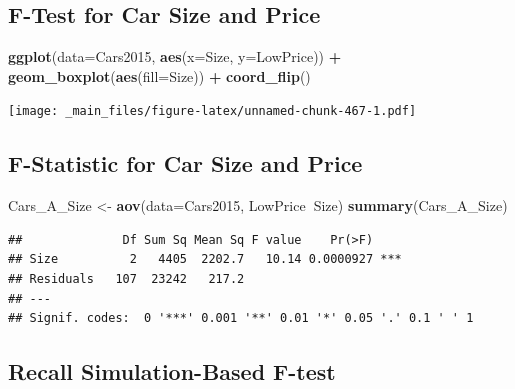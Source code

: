 \documentclass[]{book}
\newenvironment{Shaded}{\begin{snugshade}}{\end{snugshade}}
\newcommand{\KeywordTok}[1]{\textcolor[rgb]{0.13,0.29,0.53}{\textbf{#1}}}
\newcommand{\DataTypeTok}[1]{\textcolor[rgb]{0.13,0.29,0.53}{#1}}
\newcommand{\DecValTok}[1]{\textcolor[rgb]{0.00,0.00,0.81}{#1}}
\newcommand{\StringTok}[1]{\textcolor[rgb]{0.31,0.60,0.02}{#1}}
\newcommand{\OperatorTok}[1]{\textcolor[rgb]{0.81,0.36,0.00}{\textbf{#1}}}
\newcommand{\NormalTok}[1]{#1}
\begin{document}
\subsection{F-Test for Car Size and
Price}\label{f-test-for-car-size-and-price}

\begin{Shaded}
\begin{Highlighting}[]
\KeywordTok{ggplot}\NormalTok{(}\DataTypeTok{data=}\NormalTok{Cars2015, }\KeywordTok{aes}\NormalTok{(}\DataTypeTok{x=}\NormalTok{Size, }\DataTypeTok{y=}\NormalTok{LowPrice)) }\OperatorTok{+}\StringTok{ }\KeywordTok{geom_boxplot}\NormalTok{(}\KeywordTok{aes}\NormalTok{(}\DataTypeTok{fill=}\NormalTok{Size)) }\OperatorTok{+}\StringTok{ }\KeywordTok{coord_flip}\NormalTok{() }
\end{Highlighting}
\end{Shaded}

\texttt{[image: \_main\_files/figure-latex/unnamed-chunk-467-1.pdf]}

\subsection{F-Statistic for Car Size and
Price}\label{f-statistic-for-car-size-and-price-1}

\begin{Shaded}
\begin{Highlighting}[]
\NormalTok{Cars_A_Size <-}\StringTok{ }\KeywordTok{aov}\NormalTok{(}\DataTypeTok{data=}\NormalTok{Cars2015, LowPrice}\OperatorTok{~}\NormalTok{Size)}
\KeywordTok{summary}\NormalTok{(Cars_A_Size)}
\end{Highlighting}
\end{Shaded}

\begin{verbatim}
##              Df Sum Sq Mean Sq F value    Pr(>F)    
## Size          2   4405  2202.7   10.14 0.0000927 ***
## Residuals   107  23242   217.2                      
## ---
## Signif. codes:  0 '***' 0.001 '**' 0.01 '*' 0.05 '.' 0.1 ' ' 1
\end{verbatim}

\subsection{Recall Simulation-Based
F-test}\label{recall-simulation-based-f-test}

\begin{Shaded}
\end{Shaded}
\end{document}
